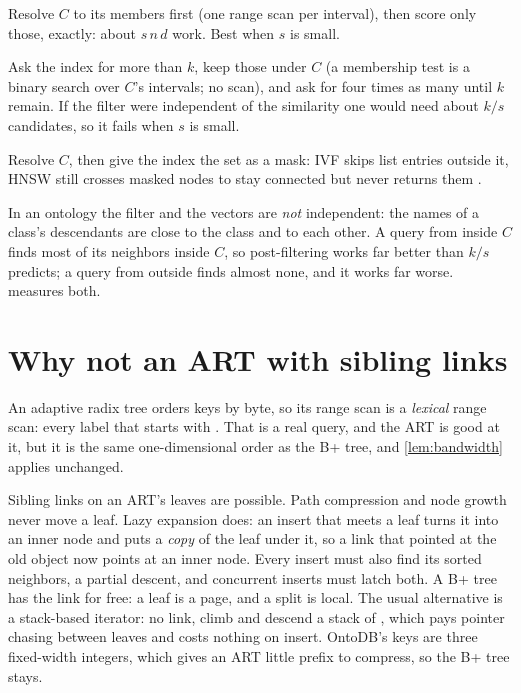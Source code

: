 \begin{description}[leftmargin=1.2em]
\item[Pre-filter.] Resolve $C$ to its members first (one range scan per
interval), then score only those, exactly: about $s\,n\,d$ work. Best when $s$ is
small.
\item[Post-filter.] Ask the index for more than $k$, keep those under $C$ (a
membership test is a binary search over $C$'s intervals; no scan), and ask for
four times as many until $k$ remain. If the filter were independent of the
similarity one would need about $k/s$ candidates, so it fails when $s$ is small.
\item[In-index filter.] Resolve $C$, then give the index the set as a mask: IVF
skips list entries outside it, HNSW still crosses masked nodes to stay connected
but never returns them \cite{patel2024}.
\end{description}

In an ontology the filter and the vectors are \emph{not} independent: the names
of a class's descendants are close to the class and to each other. A query from
inside $C$ finds most of its neighbors inside $C$, so post-filtering works far
better than $k/s$ predicts; a query from outside finds almost none, and it works
far worse.  measures both.

\section{Why not an ART with sibling links}

An adaptive radix tree \cite{leis2013} orders keys by byte, so its range scan is a
\emph{lexical} range scan: every label that starts with . That is a real
query, and the ART is good at it, but it is the same one-dimensional order as the
B+ tree, and \cref{lem:bandwidth} applies unchanged.

Sibling links on an ART's leaves are possible. Path compression and node growth
never move a leaf. Lazy expansion does: an insert that meets a leaf turns it into
an inner node and puts a \emph{copy} of the leaf under it, so a link that pointed
at the old object now points at an inner node. Every insert must also find its
sorted neighbors, a partial descent, and concurrent inserts must latch both. A B+
tree has the link for free: a leaf is a page, and a split is local. The
usual alternative is a stack-based iterator: no link, climb and descend a stack of
, which pays pointer chasing between leaves and
costs nothing on insert. OntoDB's keys are three fixed-width
integers, which gives an ART little prefix to compress, so the B+ tree stays.

